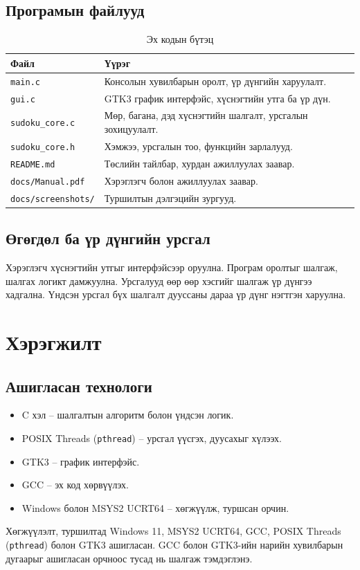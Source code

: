 \documentclass[12pt,a4paper]{report}
\begin{document}
\section{Програмын файлууд}
\begin{table}[H]\centering\caption{Эх кодын бүтэц}\begin{tabular}{p{}p{}}\toprule
\textbf{Файл}&\textbf{Үүрэг}\\\midrule
\texttt{main.c}&Консолын хувилбарын оролт, үр дүнгийн харуулалт.\\
\texttt{gui.c}&GTK3 график интерфэйс, хүснэгтийн утга ба үр дүн.\\
\texttt{sudoku\_core.c}&Мөр, багана, дэд хүснэгтийн шалгалт, урсгалын зохицуулалт.\\
\texttt{sudoku\_core.h}&Хэмжээ, урсгалын тоо, функцийн зарлалууд.\\
\texttt{README.md}&Төслийн тайлбар, хурдан ажиллуулах заавар.\\
\texttt{docs/Manual.pdf}&Хэрэглэгч болон ажиллуулах заавар.\\
\texttt{docs/screenshots/}&Туршилтын дэлгэцийн зургууд.\\\bottomrule\end{tabular}\end{table}
\section{Өгөгдөл ба үр дүнгийн урсгал}
Хэрэглэгч хүснэгтийн утгыг интерфэйсээр оруулна. Програм оролтыг шалгаж, шалгах логикт дамжуулна. Урсгалууд өөр өөр хэсгийг шалгаж үр дүнгээ хадгална. Үндсэн урсгал бүх шалгалт дууссаны дараа үр дүнг нэгтгэн харуулна.

\chapter{Хэрэгжилт}
\section{Ашигласан технологи}
\begin{itemize}\item C хэл -- шалгалтын алгоритм болон үндсэн логик.\item POSIX Threads (\texttt{pthread}) -- урсгал үүсгэх, дуусахыг хүлээх.\item GTK3 -- график интерфэйс.\item GCC -- эх код хөрвүүлэх.\item Windows болон MSYS2 UCRT64 -- хөгжүүлж, туршсан орчин.\end{itemize}
Хөгжүүлэлт, туршилтад Windows 11, MSYS2 UCRT64, GCC, POSIX Threads (\texttt{pthread}) болон GTK3 ашигласан. GCC болон GTK3-ийн нарийн хувилбарын дугаарыг ашигласан орчноос тусад нь шалгаж тэмдэглэнэ.
\end{document}
